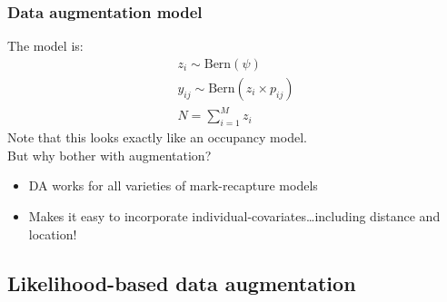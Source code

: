 \documentclass[color=usenames,dvipsnames]{beamer}\usepackage[]{graphicx}\usepackage[]{color}
\begin{document}
\begin{frame}
  \frametitle{Data augmentation model}
  The model is:
  \begin{gather*}
    z_i \sim \mathrm{Bern}(\psi) \\
    y_{ij} \sim \mathrm{Bern}(z_i \times p_{ij}) \\
    N=\sum_{i=1}^M z_i
  \end{gather*}
  \pause \vfill
  Note that this looks exactly like an occupancy model. \\
  \pause \vfill
  But why bother with augmentation?
  \begin{itemize}
    \item DA works for \alert{all} varieties of mark-recapture models
    \item Makes it easy to incorporate
      individual-covariates\dots\pause including distance and
      location!   
  \end{itemize}
\end{frame}




\subsection{Likelihood-based data augmentation}
\end{document}
